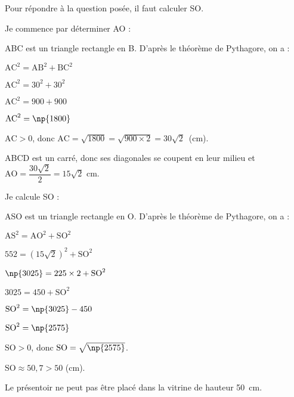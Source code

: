 \documentclass[10pt]{article}
\begin{document}
\setlength\parindent{0mm}
\pagestyle{fancy}
\thispagestyle{empty}
    
    
    




\medskip

Pour répondre à la question posée, il faut calculer SO.

Je commence par déterminer AO :

ABC est un triangle rectangle en B. D'après le théorème de Pythagore, on a :

$\text{AC}^2 = \text{AB}^2 + \text{BC}^2$

$\text{AC}^2 = 30^2 + 30^2$

$\text{AC}^2 = 900 + 900$

$\text{AC}^2 = \np{1800}$

$\text{AC} > 0$, donc $\text{AC} = \sqrt{1800} = \sqrt{900 \times 2} = 30\sqrt{2}$~(cm).

ABCD est un carré, donc ses diagonales se coupent en leur milieu et
$\text{AO} = \dfrac{30\sqrt{2}}{2} = 15\sqrt{2}$ cm.

Je calcule SO :

ASO est un triangle rectangle en O. D'après le théorème de Pythagore, on a :

$\text{AS}^2 = \text{AO}^2 + \text{SO}^2$

$552 = \left(15\sqrt{2}\right)^2 + \text{SO}^2$

$\np{3025} = 225 \times 2 + \text{SO}^2$

$3 025 = 450 + \text{SO}^2$

$\text{SO}^2 = \np{3025} - 450$

$\text{SO}^2 = \np{2575}$

$\text{SO} > 0$, donc $\text{SO} = \sqrt{\np{2575}}$.

$\text{SO} \approx  50,7> 50  $ (cm).

Le présentoir ne peut pas être placé dans la vitrine de hauteur 50~cm.

\vspace{0,5cm}
\end{document}
